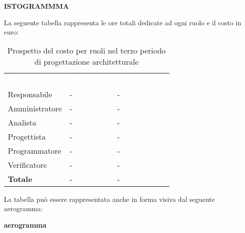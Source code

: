 \textbf{ISTOGRAMMMA}


La seguente tabella rappresenta le ore totali dedicate ad ogni ruolo e il costo in euro:

\begin{table}[!htbp]
\begin{center}
\renewcommand{\arraystretch}{1.5}
\begin{tabular}{ m{}<{\centering}  m{}<{\centering} m{}<{\centering}}
	\rowcolor{darkblue}
	\textcolor{white}{\textbf{Ruolo}}&\textcolor{white}{\textbf{Totale ore}}&\textcolor{white}{\textbf{Costo totale}}\\ 

	Responsabile  & - & - \\	

	Amministratore & - & - \\
	
	Analista & - & - \\
	
	Progettista & - & - \\
	
	Programmatore & - & - \\
	
	Verificatore & - & - \\
	
	\textbf{Totale} & - & - \\
	
\end{tabular}
\caption{Prospetto del costo per ruoli nel terzo periodo di progettazione architetturale}
\end{center}
\end{table}

La tabella può essere rappresentata anche in forma visiva dal seguente aerogramma:

\textbf{aerogramma}


